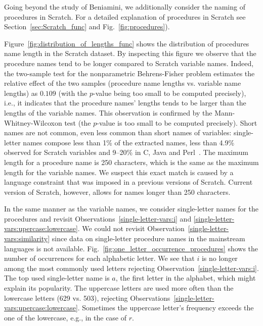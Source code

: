 \documentclass[conference]{IEEEtran}
\begin{document}
Going beyond the study of Beniamini, we additionally consider the naming of procedures in Scratch. 
For a detailed explanation of procedures in Scratch see Section~\ref{sec:Scratch_func} and Fig.~\ref{fig:procedures}).  

Figure~\ref{fig:distribution_of_lengths_func} shows the distribution of procedures name length in the Scratch dataset. 
By inspecting this figure we observe that the procedure names tend to be longer compared to Scratch variable names. 
Indeed, the two-sample test for the nonparametric Behrens-Fisher problem estimates the relative effect of the two samples (procedure name lengths vs. variable name lengths) as $0.109$ (with the $p$-value being too small to be computed precisely), i.e., it indicates that the procedure names' lengths tends to be larger than the lengths of the variable names. 
This observation is confirmed by the Mann-Whitney-Wilcoxon test (the $p$-value is too small to be computed precisely).
Short names are not common, even less common than short names of variables: single-letter names compose less than 1\% of the extracted names, less than 4.9\% observed for Scratch variables and 9--20\% in C, Java and Perl~\cite{Beniamini}. 
The maximum length for a procedure name is 250 characters, which is the same as the maximum length for the variable names. 
We suspect this exact match is caused by a language constraint that was imposed in a previous versions of Scratch. 
Current version of Scratch, however, allows for names longer than 250 characters. 

In the same manner as the variable names, we consider single-letter names for the procedures and revisit Observations~\ref{single-letter-vars:i} and \ref{single-letter-vars:upercase:lowercase}. 
We could not revisit Observation~\ref{single-letter-vars:similarity} since data on single-letter procedure names in the mainstream languages is not available.
Fig.~\ref{fig:one_letter_occurrence_procedures} shows the number of occurrences for each alphabetic letter. 
We see that $i$ is no longer among the most commonly used letters rejecting Observation~\ref{single-letter-vars:i}.
The top used single-letter name is $a$, the first letter in the alphabet, which might explain its popularity.
The uppercase letters are used more often than the lowercase letters (629 vs. 503), rejecting Observations~\ref{single-letter-vars:upercase:lowercase}.
Sometimes the uppercase letter's frequency exceeds the one of the lowercase, e.g., in the case of $r$. 
\end{document}
